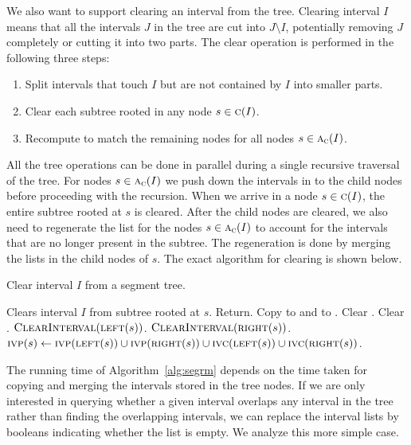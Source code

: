 \documentclass[english,gradu]{tktltiki2018}
\begin{document}
We also want to support clearing an interval from the tree.
Clearing interval $I$ means that all the intervals $J$ in the tree are cut into $J\setminus I$, potentially removing $J$ completely or cutting it into two parts.
The clear operation is performed in the following three steps:
\begin{enumerate}
\item Split intervals that touch $I$ but are not contained by $I$ into smaller parts.
\item Clear each subtree rooted in any node $s\in\textsc{c}(I)$.
\item Recompute  to match the remaining nodes for all nodes $s\in\textsc{a}_{\textsc{c}}(I)$.
\end{enumerate}

All the tree operations can be done in parallel during a single recursive traversal of the tree.
For nodes $s\in\textsc{a}_{\textsc{c}}(I)$ we push down the intervals in  to the child nodes before proceeding with the recursion.
When we arrive in a node $s\in\textsc{c}(I)$, the entire subtree rooted at $s$ is cleared.
After the child nodes are cleared, we also need to regenerate the  list for the nodes $s\in\textsc{a}_{\textsc{c}}(I)$ to account for the intervals that are no longer present in the subtree.
The regeneration is done by merging the lists in the child nodes of $s$.
The exact algorithm for clearing is shown below.

\begin{alg}\label{alg:segrm}
Clear interval $I$ from a segment tree.
\begin{algorithmic}
	\Comment Clears interval $I$ from subtree rooted at $s$.
		Return.
	\EndIf
		\State Copy  to  and to .
	\EndIf
	\State Clear .
	\State Clear .
		\State $\textsc{ClearInterval}(\textsc{left}(s))$.
		\State $\textsc{ClearInterval}(\textsc{right}(s))$.
	\EndIf
		\State $\textsc{ivp}(s)\gets \textsc{ivp}(\textsc{left}(s)) \cup \textsc{ivp}(\textsc{right}(s)) \cup \textsc{ivc}(\textsc{left}(s)) \cup \textsc{ivc}(\textsc{right}(s))$.
	\EndIf
\EndProcedure
\end{algorithmic}
\end{alg}

The running time of Algorithm~\ref{alg:segrm} depends on the time taken for copying and merging the intervals stored in the tree nodes.
If we are only interested in querying whether a given interval overlaps any interval in the tree rather than finding the overlapping intervals, we can replace the interval lists by booleans indicating whether the list is empty.
We analyze this more simple case.
\end{document}
